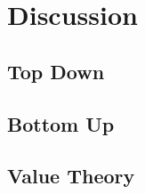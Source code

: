 \section{Discussion}\label{sec:discussion}
\subsection{Top Down}\label{subsec:discussion_top_down}
\subsection{Bottom Up}\label{subsec:discussion_bottom_up}
\subsection{Value Theory}\label{subsec:discussion_value_theory}